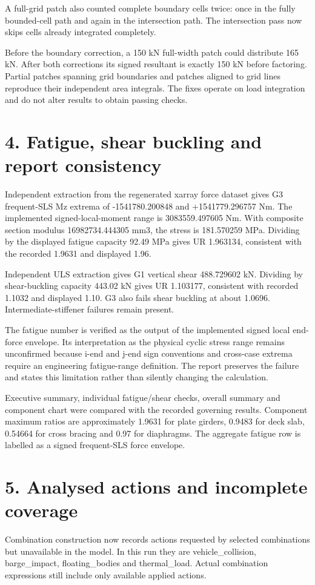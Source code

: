 \documentclass{article}%
\begin{document}
%
A full{-}grid patch also counted complete boundary cells twice: once in the fully bounded{-}cell path and again in the intersection path. The intersection pass now skips cells already integrated completely.%


%
Before the boundary correction, a 150 kN full{-}width patch could distribute 165 kN. After both corrections its signed resultant is exactly 150 kN before factoring. Partial patches spanning grid boundaries and patches aligned to grid lines reproduce their independent area integrals. The fixes operate on load integration and do not alter results to obtain passing checks.%

%
\section*{4. Fatigue, shear buckling and report consistency}%
\label{sec:4.Fatigue,shearbucklingandreportconsistency}%
Independent extraction from the regenerated xarray force dataset gives G3 frequent{-}SLS Mz extrema of {-}1541780.200848 and +1541779.296757 Nm. The implemented signed{-}local{-}moment range is 3083559.497605 Nm. With composite section modulus 16982734.444305 mm3, the stress is 181.570259 MPa. Dividing by the displayed fatigue capacity 92.49 MPa gives UR 1.963134, consistent with the recorded 1.9631 and displayed 1.96.%


%
Independent ULS extraction gives G1 vertical shear 488.729602 kN. Dividing by shear{-}buckling capacity 443.02 kN gives UR 1.103177, consistent with recorded 1.1032 and displayed 1.10. G3 also fails shear buckling at about 1.0696. Intermediate{-}stiffener failures remain present.%


%
The fatigue number is verified as the output of the implemented signed local end{-}force envelope. Its interpretation as the physical cyclic stress range remains unconfirmed because i{-}end and j{-}end sign conventions and cross{-}case extrema require an engineering fatigue{-}range definition. The report preserves the failure and states this limitation rather than silently changing the calculation.%


%
Executive summary, individual fatigue/shear checks, overall summary and component chart were compared with the recorded governing results. Component maximum ratios are approximately 1.9631 for plate girders, 0.9483 for deck slab, 0.54664 for cross bracing and 0.97 for diaphragms. The aggregate fatigue row is labelled as a signed frequent{-}SLS force envelope.%

%
\section*{5. Analysed actions and incomplete coverage}%
\label{sec:5.Analysedactionsandincompletecoverage}%
Combination construction now records actions requested by selected combinations but unavailable in the model. In this run they are vehicle\_collision, barge\_impact, floating\_bodies and thermal\_load. Actual combination expressions still include only available applied actions.%
\end{document}
